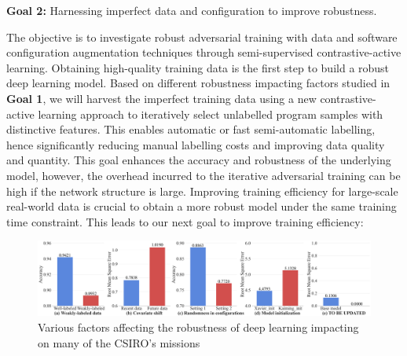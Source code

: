 \begin{formal}\noindent
{\bf Goal 2:} Harnessing imperfect data and configuration to improve robustness.
\end{formal}
\noindent
The objective is to investigate robust adversarial training with data and software configuration augmentation techniques through semi-supervised contrastive-active learning. 
Obtaining high-quality training data is the first step to build a robust deep learning model. Based on different robustness impacting factors studied in \textbf{Goal 1}, we will harvest the imperfect training data using a new contrastive-active learning approach to iteratively select unlabelled program samples with distinctive features. This enables automatic or fast semi-automatic labelling, hence significantly reducing
manual labelling costs and improving data quality and quantity. This goal enhances the accuracy and robustness of the underlying model, however, the overhead incurred to the iterative adversarial training can be high if the network structure is large. Improving training efficiency for large-scale real-world data is crucial to obtain a more robust model under the same training time constraint. This leads to our next goal to improve training efficiency:


\begin{figure}[t]
    \centering
    \includegraphics[width=\linewidth]{fig/factors.pdf}
    \caption{Various factors affecting the robustness of deep learning impacting on many of the CSIRO's missions  }
    \label{fig:motivation}
\end{figure}

